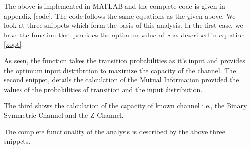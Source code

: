 The above is implemented in MATLAB and the complete code is given in appendix \ref{code}. The code follows the same equations as the given above. We look at three snippets which form the basis of this analysis. In the first case, we have the function that provides the optimum value of $x$ as described in equation \ref{xopt}.

\vspace{\baselineskip}

\vspace{\baselineskip}

As seen, the function takes the transition probabilities as it's input and provides the optimum input distribution to maximize the capacity of the channel. The second snippet, details the calculation of the Mutual Information provided the values of the probabilities of transition and the input distribution.

\vspace{\baselineskip}

\vspace{\baselineskip}

The third shows the calculation of the capacity of known channel i.e., the Binary Symmetric Channel and the Z Channel.

\vspace{\baselineskip}

\vspace{\baselineskip}

The complete functionality of the analysis is described by the above three snippets.